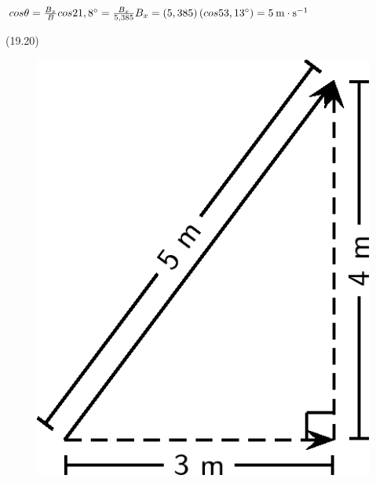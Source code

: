 {\begin{mdframed}[linewidth=4, leftmargin=40, rightmargin=40]
\begin{exercise}
\begin{enumerate}[noitemsep, label=\textbf{Step} \textbf{\arabic*}. ]
{      \addtolength{\mymathboxwidth}{-48pt}
    \par\vspace{12pt}\noindent\begin{minipage}{\columnwidth}
    \parbox[t]{\mymathboxwidth}{\large\begin{math}
    cos\theta =\frac{{B}_{x}}{B}cos21,{8}^{\circ }=\frac{{B}_{x}}{5,385}{B}_{x}=\left(5,385\right)\left(cos53,{13}^{\circ }\right)=5\phantom{\rule{2pt}{0ex}}\mathrm{m}\ensuremath{\cdot}{\mathrm{s}}^{-1}\end{math}}\hfill
    \parbox[t]{48pt}{\raggedleft 
    (19.20)}
    \end{minipage}\vspace{12pt}\par
    }%
    
        
        \label{m38819*id195278}
          
    \setcounter{subfigure}{0}


	\begin{figure}[H] %
    \begin{center}
    \label{m38819*id195281!!!underscore!!!media}\label{m38819*id195281!!!underscore!!!printimage}\includegraphics{col11305.imgs/m38819_PG11C1_067.png} %
        

\end{center}
\end{figure}
\end{enumerate}
\end{exercise}
\end{mdframed}}
